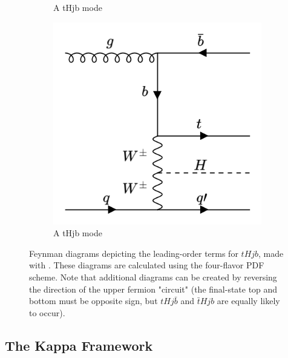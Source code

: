 \begin{figure}[htp]
\begin{subfigure}[b]{0.3\textwidth}
         \caption{A tHjb mode}
         \label{fig:tHjb4}
     \end{subfigure}
     \hfill
         \begin{subfigure}[b]{0.3\textwidth}
         \centering
         \includegraphics[width=\textwidth]{figures/theory_chapter/tHjb5.png}
         \caption{A tHjb mode}
         \label{fig:tHjb5}
     \end{subfigure}
  \label{fig:tHjbmodes}
  \caption{Feynman diagrams depicting the leading-order terms for $tHjb$, made with \cite{FeynmanMaker}. These diagrams are calculated using the four-flavor PDF scheme. Note that additional diagrams can be created by reversing the direction of the upper fermion "circuit" (the final-state top and bottom must be opposite sign, but $tHj\bar{b}$ and $\bar{t}Hjb$ are equally likely to occur).}  
\end{figure}

\subsection{The Kappa Framework} \label{sec:kappaFW}

